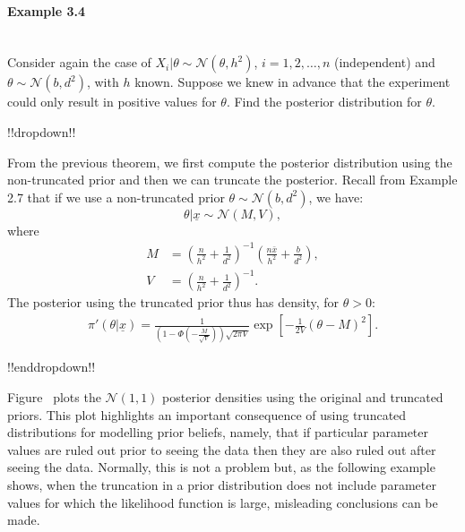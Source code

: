 \paragraph{Example 3.4}{~\\
Consider again the case of $X_i|\theta\sim \mathcal{N}(\theta,h^2)$, $i=1,2,\ldots,n$
(independent) and $\theta\sim \mathcal{N}(b,d^2)$, with $h$ known.
Suppose we knew in advance that the experiment could only result in positive values for $\theta$.
Find the posterior distribution for $\theta$.

!!dropdown!!

From the previous theorem, we first compute the posterior distribution using the non-truncated prior and then we can truncate the posterior. Recall from Example 2.7 that if we use a non-truncated prior $\theta \sim\mathcal{N}(b,d^2)$, we have:
    $$ \theta | \underline{x} \sim \mathcal{N}(M, V), $$
    where
    \begin{align*}
        M &= \left(\frac{n}{h^2} + \frac{1}{d^2}\right)^{-1}\left(\frac{n\bar{x}}{h^2} + \frac{b}{d^2}\right), \\
        V &= \left(\frac{n}{h^2} + \frac{1}{d^2}\right)^{-1}.
    \end{align*}
    The posterior using the truncated prior thus has density, for $\theta > 0$:
    \begin{align*}
        \pi'(\theta | \underline{x}) = \frac{1}{\left(1 - \Phi\left(-\frac{M}{\sqrt{V}}\right)\right) \sqrt{2\pi V}}\exp\left[-\frac{1}{2V}(\theta - M)^2\right].
    \end{align*}

!!enddropdown!!

Figure~ plots the $\mathcal{N}(1,1)$ posterior densities
using the original and truncated priors.
This plot highlights an important consequence of using truncated
distributions for modelling prior beliefs, namely, that if particular
parameter values are ruled out prior to seeing the data then they are
also ruled out after seeing the data. Normally, this is not a problem
but, as the following example shows, when the truncation in a prior
distribution does not include parameter values for which the
likelihood function is large, misleading conclusions can be made.

\begin{figure}[h!]


\end{figure}}
